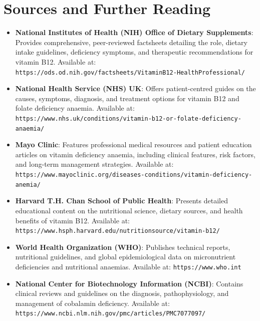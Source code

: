 \section*{Sources and Further Reading}
\begin{itemize}
    \item \textbf{National Institutes of Health (NIH) Office of Dietary Supplements}: Provides comprehensive, peer-reviewed factsheets detailing the role, dietary intake guidelines, deficiency symptoms, and therapeutic recommendations for vitamin B12. Available at: \texttt{https://ods.od.nih.gov/factsheets/VitaminB12-HealthProfessional/}
    \item \textbf{National Health Service (NHS) UK}: Offers patient-centred guides on the causes, symptoms, diagnosis, and treatment options for vitamin B12 and folate deficiency anaemia. Available at: \texttt{https://www.nhs.uk/conditions/vitamin-b12-or-folate-deficiency-anaemia/}
    \item \textbf{Mayo Clinic}: Features professional medical resources and patient education articles on vitamin deficiency anaemia, including clinical features, risk factors, and long-term management strategies. Available at: \texttt{https://www.mayoclinic.org/diseases-conditions/vitamin-deficiency-anemia/}
    \item \textbf{Harvard T.H. Chan School of Public Health}: Presents detailed educational content on the nutritional science, dietary sources, and health benefits of vitamin B12. Available at: \texttt{https://www.hsph.harvard.edu/nutritionsource/vitamin-b12/}
    \item \textbf{World Health Organization (WHO)}: Publishes technical reports, nutritional guidelines, and global epidemiological data on micronutrient deficiencies and nutritional anaemias. Available at: \texttt{https://www.who.int}
    \item \textbf{National Center for Biotechnology Information (NCBI)}: Contains clinical reviews and guidelines on the diagnosis, pathophysiology, and management of cobalamin deficiency. Available at: \texttt{https://www.ncbi.nlm.nih.gov/pmc/articles/PMC7077097/}
\end{itemize}